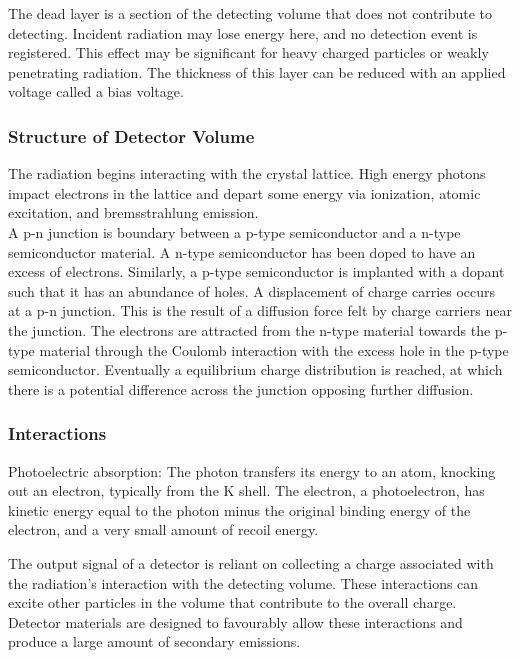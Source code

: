 \documentclass[12pt]{article}
\begin{document}
\begin{doublespacing}
The dead layer is a section of the detecting volume that does not contribute to detecting. 
Incident radiation may lose energy here, and no detection event is registered. 
This effect may be significant for heavy charged particles or weakly penetrating radiation.
The thickness of this layer can be reduced with an applied voltage called a bias voltage.
\\


\subsubsection{Structure of Detector Volume}

The radiation begins interacting with the crystal lattice. 
High energy photons impact electrons in the lattice and depart some energy via ionization, atomic excitation, and bremsstrahlung emission. 
\\

A p-n junction is boundary between a p-type semiconductor and a n-type semiconductor material. 
A n-type semiconductor has been doped to have an excess of electrons. 
Similarly, a p-type semiconductor is implanted with a dopant such that it has an abundance of holes. 
A displacement of charge carries occurs at a p-n junction. 
This is the result of a diffusion force felt by charge carriers near the junction. 
The electrons are attracted from the n-type material towards the p-type material through the Coulomb interaction with the excess hole in the p-type semiconductor. 
Eventually a equilibrium charge distribution is reached, at which there is a potential difference across the junction opposing further diffusion.
\\


\subsubsection{Interactions}
Photoelectric absorption: The photon transfers its energy to an atom, knocking out an electron, typically from the K shell. 
The electron, a photoelectron, has kinetic energy equal to the photon minus the original binding energy of the electron, and a very small amount of recoil energy.

The output signal of a detector is reliant on collecting a charge associated with the radiation's interaction with the detecting volume. 
These interactions can excite other particles in the volume that contribute to the overall charge.
Detector materials are designed to favourably allow these interactions and produce a large amount of secondary emissions. 
\\



\end{doublespacing}
\end{document}
